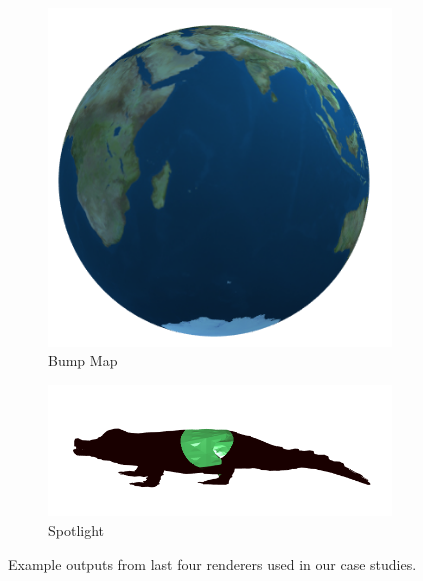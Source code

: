 \begin{figure}
\begin{subfigure}[b]{0.45\linewidth}
		\includegraphics[width=\linewidth]{fig/bump.png}
		\caption{Bump Map}
	\end{subfigure}
	\hfill
	\begin{subfigure}[b]{0.45\linewidth}
		\centering
		\includegraphics[width=\linewidth]{fig/spotlight.png}
		\caption{Spotlight}
	\end{subfigure}
	\caption{Example outputs from last four renderers used in our case studies.}
\end{figure}